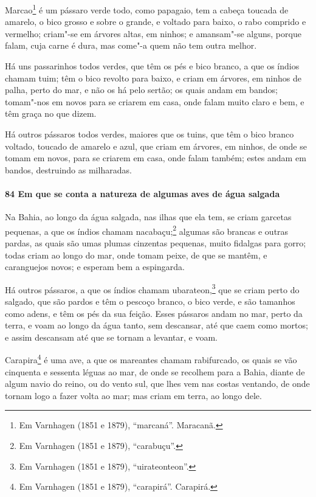 \begin{linenumbers}
Marcao\footnote{ Em Varnhagen (1851 e 1879), ``marcaná''. Maracanã.} é um pássaro verde
todo, como papagaio, tem a cabeça toucada de amarelo, o bico grosso e sobre o grande, e
voltado para baixo, o rabo comprido e vermelho; criam"-se em árvores altas, em ninhos; e
amansam"-se alguns, porque falam, cuja carne é dura, mas come"-a quem não tem outra melhor.

Há uns passarinhos todos verdes, que têm os pés e bico branco, a que os índios chamam
tuim; têm o bico revolto para baixo, e criam em árvores, em ninhos de palha, perto do mar,
e não os há pelo sertão; os quais andam em bandos; tomam"-nos em novos para se criarem em
casa, onde falam muito claro e bem, e têm graça no que dizem.

Há outros pássaros todos verdes, maiores que os tuins, que têm o bico branco voltado,
toucado de amarelo e azul, que criam em árvores, em ninhos, de onde se tomam em novos,
para se criarem em casa, onde falam também; estes andam em bandos, destruindo as
milharadas.

\paragraph{84 Em que se conta a natureza de algumas aves de água salgada}\quad
Na Bahia, ao longo da água salgada, nas ilhas que ela tem, se criam garcetas pequenas, a
que os índios chamam nacabaçu;\footnote{ Em Varnhagen (1851 e 1879), ``carabuçu''.}
algumas são brancas e outras pardas, as quais são umas plumas cinzentas pequenas, muito
fidalgas para gorro; todas criam ao longo do mar, onde tomam peixe, de que se mantêm, e
caranguejos novos; e esperam bem a espingarda.

Há outros pássaros, a que os índios chamam ubarateon,\footnote{ Em Varnhagen (1851 e 1879),
``uirateonteon''.} que se criam perto do salgado, que são pardos e têm o pescoço branco,
o bico verde, e são tamanhos como adens, e têm os pés da sua feição. Esses pássaros andam
no mar, perto da terra, e voam ao longo da água tanto, sem descansar, até que caem como
mortos; e assim descansam até que se tornam a levantar, e voam.

Carapira\footnote{ Em Varnhagen (1851 e 1879), ``carapirá''. Carapirá.} é uma ave, a que
os mareantes chamam rabifurcado, os quais se vão cinquenta e sessenta léguas ao mar, de
onde se recolhem para a Bahia, diante de algum navio do reino, ou do vento sul, que lhes
vem nas costas ventando, de onde tornam logo a fazer volta ao mar; mas criam em terra, ao
longo dele.


\end{linenumbers}
